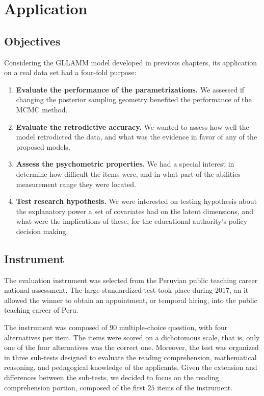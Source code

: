\chapter{Application} \label{chap:application}

\section{Objectives}

Considering the GLLAMM model developed in previous chapters, its application on a real data set had a four-fold purpose:

\begin{enumerate}
	\item \textbf{Evaluate the performance of the parametrizations.} We assessed if changing the posterior sampling geometry benefited the performance of the MCMC method.
	\item \textbf{Evaluate the retrodictive accuracy.} We wanted to assess how well the model retrodicted the data, and what was the evidence in favor of any of the proposed models.
	\item \textbf{Assess the psychometric properties.} We had a special interest in determine how difficult the items were, and in what part of the abilities measurement range they were located.
	\item \textbf{Test research hypothesis.} We were interested on testing hypothesis about the explanatory power a set of covariates had on the latent dimensions, and what were the implications of these, for the educational authority's policy decision making.
\end{enumerate}


\section{Instrument}

The evaluation instrument was selected from the Peruvian public teaching career national assessment. The large standardized test took place during $2017$, an it allowed the winner to obtain an appointment, or temporal hiring, into the public teaching career of Peru. 

The instrument was composed of $90$ multiple-choice question, with four alternatives per item. The items were scored on a dichotomous scale, that is, only one of the four alternatives was the correct one. Moreover, the test was organized in three sub-tests designed to evaluate the reading comprehension, mathematical reasoning, and pedagogical knowledge of the applicants. Given the extension and differences between the sub-tests, we decided to focus on the reading comprehension portion, composed of the first $25$ items of the instrument. 

